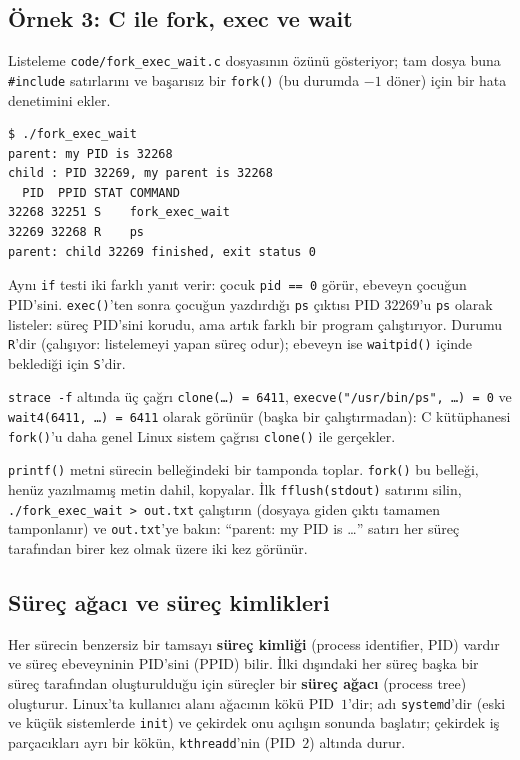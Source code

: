\documentclass[11pt,a4paper]{article}
\newcommand{\term}[1]{\textbf{\color{mintdeep}#1}}
\newcommand{\cmd}[1]{\texttt{#1}}
\begin{document}
\subsection{Örnek 3: C ile fork, exec ve wait}

Listeleme \texttt{code/fork\_exec\_wait.c} dosyasının özünü gösteriyor; tam dosya buna \texttt{\#include} satırlarını ve başarısız bir \cmd{fork()} (bu durumda $-1$ döner) için bir hata denetimini ekler.



\begin{lstlisting}[style=term]
$ ./fork_exec_wait
parent: my PID is 32268
child : PID 32269, my parent is 32268
  PID  PPID STAT COMMAND
32268 32251 S    fork_exec_wait
32269 32268 R    ps
parent: child 32269 finished, exit status 0
\end{lstlisting}

Aynı \texttt{if} testi iki farklı yanıt verir: çocuk \texttt{pid == 0} görür, ebeveyn çocuğun PID'sini. \cmd{exec()}'ten sonra çocuğun yazdırdığı \cmd{ps} çıktısı PID $32269$'u \texttt{ps} olarak listeler: süreç PID'sini korudu, ama artık farklı bir program çalıştırıyor. Durumu \texttt{R}'dir (çalışıyor: listelemeyi yapan süreç odur); ebeveyn ise \cmd{waitpid()} içinde beklediği için \texttt{S}'dir.

\cmd{strace -f} altında üç çağrı \cmd{clone(\dots) = 6411}, \cmd{execve("/usr/bin/ps", \dots) = 0} ve \cmd{wait4(6411, \dots) = 6411} olarak görünür (başka bir çalıştırmadan): C kütüphanesi \cmd{fork()}'u daha genel Linux sistem çağrısı \cmd{clone()} ile gerçekler.

\begin{tryit}
\cmd{printf()} metni sürecin belleğindeki bir tamponda toplar. \cmd{fork()} bu belleği, henüz yazılmamış metin dahil, kopyalar. İlk \cmd{fflush(stdout)} satırını silin, \cmd{./fork\_exec\_wait > out.txt} çalıştırın (dosyaya giden çıktı tamamen tamponlanır) ve \texttt{out.txt}'ye bakın: ``parent: my PID is \dots'' satırı her süreç tarafından birer kez olmak üzere iki kez görünür.
\end{tryit}


\subsection{Süreç ağacı ve süreç kimlikleri}

Her sürecin benzersiz bir tamsayı \term{süreç kimliği} (process identifier, PID) vardır ve süreç ebeveyninin PID'sini (PPID) bilir. İlki dışındaki her süreç başka bir süreç tarafından oluşturulduğu için süreçler bir \term{süreç ağacı} (process tree) oluşturur. Linux'ta kullanıcı alanı ağacının kökü PID~$1$'dir; adı \cmd{systemd}'dir (eski ve küçük sistemlerde \cmd{init}) ve çekirdek onu açılışın sonunda başlatır; çekirdek iş parçacıkları ayrı bir kökün, \cmd{kthreadd}'nin (PID~$2$) altında durur.
\end{document}
